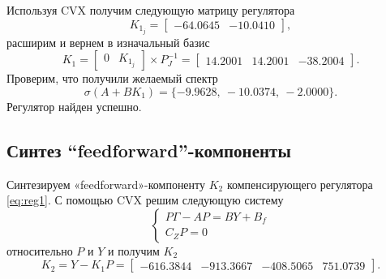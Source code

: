Используя CVX получим следующую матрицу регулятора
\begin{equation*}
    K_{1_j}=\begin{bmatrix}
        -64.0645&-10.0410
    \end{bmatrix},
\end{equation*}
расширим и вернем в изначальный базис
\begin{equation*}
    K_1=\begin{bmatrix}
        0&K_{1_j}
    \end{bmatrix}\times P_J^{-1}=
    \begin{bmatrix}
        14.2001&	14.2001&	-38.2004
    \end{bmatrix}.
\end{equation*}
Проверим, что получили желаемый спектр
\begin{equation*}
    \sigma(A+BK_1)=\{-9.9628,\    -10.0374,\    -2.0000\}.
\end{equation*}
Регулятор найден успешно.


\subsection{Синтез ``feedforward''-компоненты}

Синтезируем «feedforward»-компоненту $K_2$ компенсирующего регулятора \eqref{eq:reg1}.
С помощью CVX решим следующую систему
\begin{equation*}
    \begin{cases}
        P\Gamma-AP=BY+B_f\\
        C_ZP=0
    \end{cases}
\end{equation*}
относительно $P$ и $Y$ и получим $K_2$
\begin{equation*}
    K_2=Y-K_1P=\begin{bmatrix}
        -616.3844	&-913.3667	&-408.5065	&751.0739
    \end{bmatrix}.
\end{equation*}

